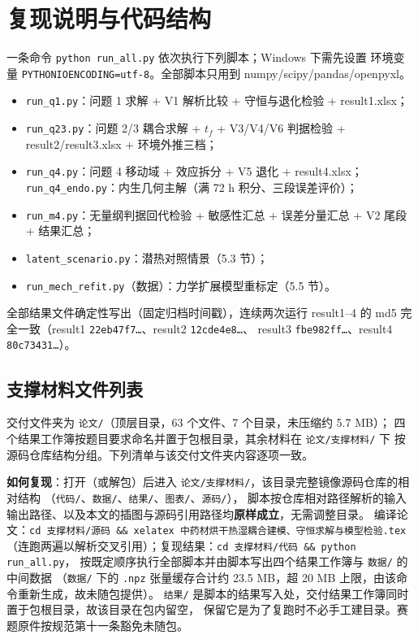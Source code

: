\documentclass[12pt,a4paper]{ctexart}
\numberwithin{equation}{section}
\begin{document}
\section{复现说明与代码结构}
一条命令 \texttt{python run\_all.py} 依次执行下列脚本；Windows 下需先设置
环境变量 \texttt{PYTHONIOENCODING=utf-8}。全部脚本只用到
numpy/scipy/pandas/openpyxl。
\begin{itemize}
  \item \texttt{run\_q1.py}：问题 1 求解 + V1 解析比较 + 守恒与退化检验 + result1.xlsx；
  \item \texttt{run\_q23.py}：问题 2/3 耦合求解 + $t_f$ + V3/V4/V6 判据检验 +
        result2/result3.xlsx + 环境外推三档；
  \item \texttt{run\_q4.py}：问题 4 移动域 + 效应拆分 + V5 退化 + result4.xlsx；
        \texttt{run\_q4\_endo.py}：内生几何主解（满 72 h 积分、三段误差评价）；
  \item \texttt{run\_m4.py}：无量纲判据回代检验 + 敏感性汇总 + 误差分量汇总 +
        V2 尾段 + 结果汇总；
  \item \texttt{latent\_scenario.py}：潜热对照情景（5.3 节）；
  \item \texttt{run\_mech\_refit.py}（数据）：力学扩展模型重标定（5.5 节）。
\end{itemize}
全部结果文件确定性写出（固定归档时间戳），连续两次运行 result1--4 的 md5
完全一致（result1 \texttt{22eb47f7…}、result2 \texttt{12cde4e8…}、
result3 \texttt{fbe982ff…}、result4 \texttt{80c73431…}）。

\subsection*{支撑材料文件列表}
交付文件夹为 \texttt{论文/}（顶层目录，63 个文件、7 个目录，未压缩约 5.7 MB）；
四个结果工作簿按题目要求命名并置于包根目录，其余材料在 \texttt{论文/支撑材料/} 下
按源码仓库结构分组。下列清单与该交付文件夹内容逐项一致。

\textbf{如何复现}：打开（或解包）后进入 \texttt{论文/支撑材料/}，该目录完整镜像源码仓库的相对结构
（\texttt{代码/}、\texttt{数据/}、\texttt{结果/}、\texttt{图表/}、\texttt{源码/}），
脚本按仓库相对路径解析的输入输出路径、以及本文的插图与源码引用路径均\textbf{原样成立}，无需调整目录。
编译论文：\texttt{cd 支撑材料/源码 \&\& xelatex 中药材烘干热湿耦合建模、守恒求解与模型检验.tex}
（连跑两遍以解析交叉引用）；复现结果：\texttt{cd 支撑材料/代码 \&\& python run\_all.py}，
按既定顺序执行全部脚本并由脚本写出四个结果工作簿与 \texttt{数据/} 的中间数据
（\texttt{数据/} 下的 \texttt{.npz} 张量缓存合计约 23.5 MB，超 20 MB 上限，由该命令重新生成，故未随包提供）。
\texttt{结果/} 是脚本的结果写入处，交付结果工作簿同时置于包根目录，故该目录在包内留空，
保留它是为了复跑时不必手工建目录。赛题原件按规范第十一条豁免未随包。
\end{document}
